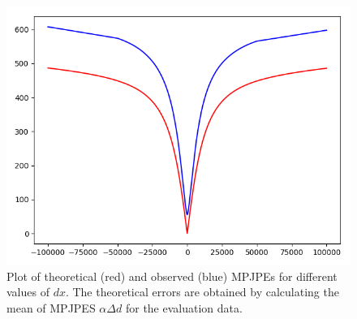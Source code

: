 \begin{figure}[ht]	
	\centering
	\includegraphics[scale=0.5]{figures/x_shift_error.png}
	\caption{Plot of theoretical (red) and observed (blue) MPJPEs for different values of $dx$. 
		The theoretical errors are obtained by calculating the mean of MPJPES $\alpha \Delta d$ for the evaluation data.}
	\label{fig:x-shift-error}
\end{figure}